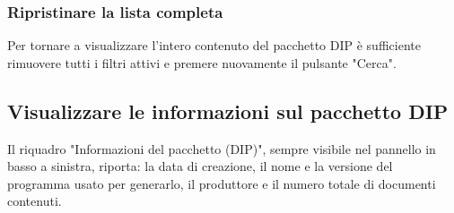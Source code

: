 \documentclass[a4paper,12pt]{article}
\begin{document}
            \subsubsection{Ripristinare la lista completa}
            Per tornare a visualizzare l'intero contenuto del pacchetto DIP è sufficiente rimuovere tutti i filtri attivi e premere nuovamente il pulsante "Cerca".
            
        \subsection{Visualizzare le informazioni sul pacchetto DIP}
        Il riquadro "Informazioni del pacchetto (DIP)", sempre visibile nel pannello in basso a sinistra, riporta: la data di creazione, il nome e la versione del programma usato per generarlo, il produttore e il numero totale di documenti contenuti.
\end{document}
